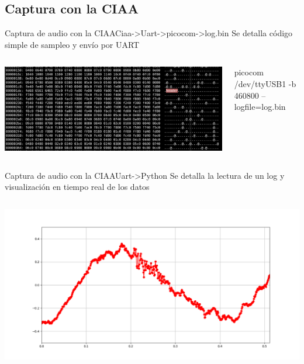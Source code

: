  \subsection{Captura con la CIAA}
 \begin{frame}{Captura de audio con la CIAA}{Ciaa->Uart->picocom->log.bin}
    \handsonicon
      Se detalla código simple de sampleo y envío por UART
    \begin{columns}[onlytextwidth]
       
       \includegraphics[width=\textwidth]{1_clase/ciaa/psf1/log.png}
       \begin{block}{\tiny{picocom /dev/ttyUSB1 -b 460800 --logfile=log.bin}}
       \end{block}
    \end{columns}
    \vfill
 \end{frame}
 \begin{frame}{Captura de audio con la CIAA}{Uart->Python}
    \handsonicon
    Se detalla la lectura de un log y visualización en tiempo real de los datos
    \begin{columns}[onlytextwidth]
       
       
       \includegraphics[width=\textwidth]{1_clase/ciaa/psf1/visualize.png}
    \end{columns}
    \vfill
 \end{frame}
